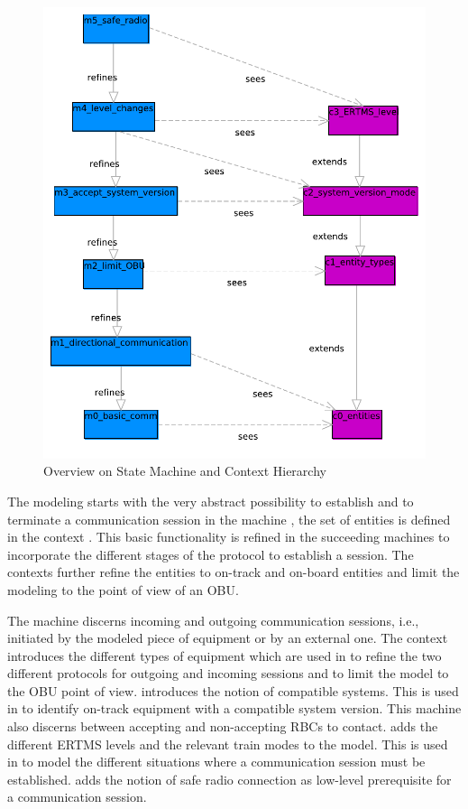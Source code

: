 \documentclass{template/openetcs_article}
\begin{document}
\begin{figure}[ht]
  \centering
  \includegraphics[width=.65\textwidth]{Subset_026_comm_session}
  \caption{Overview on State Machine and Context Hierarchy}
  \label{fig:model-overview}
\end{figure}

The modeling starts with the very abstract possibility to establish and to
terminate a communication session in the machine , the set of
entities is defined in the context . This basic functionality is
refined in the succeeding machines to incorporate the different stages of the
protocol to establish a session. The contexts further refine the entities to
on-track and on-board entities and limit the modeling to the point of view of an
OBU.

The machine  discerns incoming and outgoing communication sessions,
i.e., initiated by the modeled piece of equipment or by an external one. The
context  introduces the different types of equipment which are used in
 to refine the two different protocols for outgoing and incoming
sessions and to limit the model to the OBU point of view.  introduces
the notion of compatible systems. This is used in  to identify
on-track equipment with a compatible system version. This machine also discerns
between accepting and non-accepting RBCs to contact.  adds the
different ERTMS levels and the relevant train modes to the model. This is used
in  to model the different situations where a communication session
must be established.  adds the notion of safe radio connection as
low-level prerequisite for a communication session.
\end{document}
